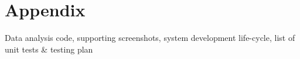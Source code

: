 \section{Appendix}

Data analysis code, supporting screenshots, system development life-cycle, list of unit tests \& testing plan